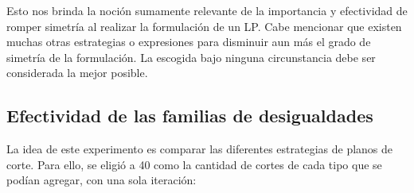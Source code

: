 Esto nos brinda la noción sumamente relevante de la importancia y efectividad de romper simetría al realizar la formulación de un LP. Cabe mencionar que existen muchas otras estrategias o expresiones para disminuir aun más el grado de simetría de la formulación. La escogida bajo ninguna circunstancia debe ser considerada la mejor posible.

\pagebreak

\subsection{Efectividad de las familias de desigualdades}

La idea de este experimento es comparar las diferentes estrategias de planos de corte. Para ello, se eligió a 40 como la cantidad de cortes de cada tipo que se podían agregar, con una sola iteración:

